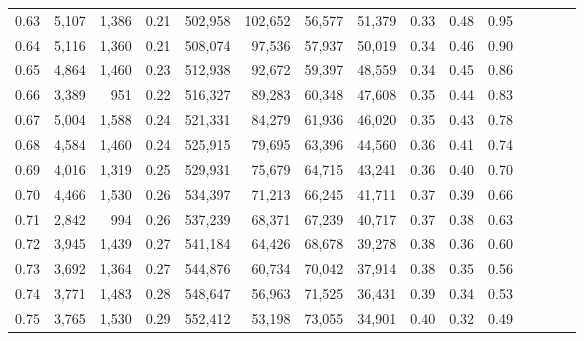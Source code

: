 \begin{tabular}{rrrcrrrrrrrrrrr}
0.63 &   5,107 &  1,386 &                                       0.21 &  502,958 &  102,652 &   56,577 &   51,379 &  0.33 &  0.48 &                         0.95 \\
0.64 &   5,116 &  1,360 &                                       0.21 &  508,074 &   97,536 &   57,937 &   50,019 &  0.34 &  0.46 &                         0.90 \\
0.65 &   4,864 &  1,460 &                                       0.23 &  512,938 &   92,672 &   59,397 &   48,559 &  0.34 &  0.45 &                         0.86 \\
0.66 &   3,389 &    951 &                                       0.22 &  516,327 &   89,283 &   60,348 &   47,608 &  0.35 &  0.44 &                         0.83 \\
0.67 &   5,004 &  1,588 &                                       0.24 &  521,331 &   84,279 &   61,936 &   46,020 &  0.35 &  0.43 &                         0.78 \\
0.68 &   4,584 &  1,460 &                                       0.24 &  525,915 &   79,695 &   63,396 &   44,560 &  0.36 &  0.41 &                         0.74 \\
0.69 &   4,016 &  1,319 &                                       0.25 &  529,931 &   75,679 &   64,715 &   43,241 &  0.36 &  0.40 &                         0.70 \\
0.70 &   4,466 &  1,530 &                                       0.26 &  534,397 &   71,213 &   66,245 &   41,711 &  0.37 &  0.39 &                         0.66 \\
0.71 &   2,842 &    994 &                                       0.26 &  537,239 &   68,371 &   67,239 &   40,717 &  0.37 &  0.38 &                         0.63 \\
0.72 &   3,945 &  1,439 &                                       0.27 &  541,184 &   64,426 &   68,678 &   39,278 &  0.38 &  0.36 &                         0.60 \\
0.73 &   3,692 &  1,364 &                                       0.27 &  544,876 &   60,734 &   70,042 &   37,914 &  0.38 &  0.35 &                         0.56 \\
0.74 &   3,771 &  1,483 &                                       0.28 &  548,647 &   56,963 &   71,525 &   36,431 &  0.39 &  0.34 &                         0.53 \\
0.75 &   3,765 &  1,530 &                                       0.29 &  552,412 &   53,198 &   73,055 &   34,901 &  0.40 &  0.32 &                         0.49 \\

\end{tabular}
